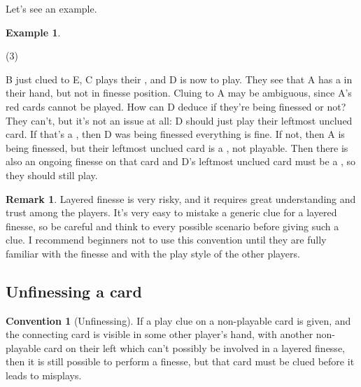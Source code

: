 \documentclass[a4paper]{article}
\theoremstyle{plain}
\theoremstyle{definition}
\newtheorem{remark}[theorem]{Remark}
\newtheorem{example}[theorem]{Example}
\newtheorem{convention}[theorem]{Convention}
\begin{document}
Let's see an example.

\begin{example}
	\hfill	
	\begin{tasks}(3)
		\task[+]      
		\task[A]    
		\task[B]    
		\task[C]    
		\task[D]    
		\task[E]    
	\end{tasks}
	
	B just clued  to E, C plays their , and D is now to play. They see that A has a  in their hand, but not in finesse position. Cluing  to A may be ambiguous, since A's red cards cannot be played. How can D deduce if they're being finessed or not? They can't, but it's not an issue at all: D should just play their leftmost unclued card. If that's a , then D was being finessed everything is fine. If not, then A is being finessed, but their leftmost unclued card is a , not playable. Then there is also an ongoing finesse on that card and D's leftmost unclued card must be a , so they should still play.	
\end{example}

\begin{remark}
	Layered finesse is very risky, and it requires great understanding and trust among the players. It's very easy to mistake a generic clue for a layered finesse, so be careful and think to every possible scenario before giving such a clue. I recommend beginners not to use this convention until they are fully familiar with the finesse and with the play style of the other players.
\end{remark}

\subsection{Unfinessing a card}

\begin{convention}[Unfinessing]
	\label{unfinessing}
	If a play clue on a non-playable card is given, and the connecting card is visible in some other player's hand, with another non-playable card on their left which can't possibly be involved in a layered finesse, then it is still possible to perform a finesse, but that card must be clued before it leads to misplays.
\end{convention}
\end{document}
